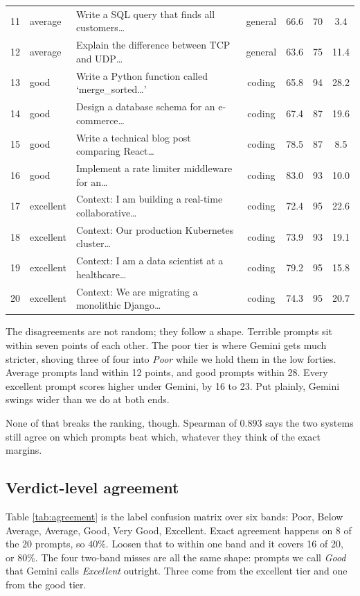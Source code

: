 \documentclass[conference]{IEEEtran}
\begin{document}
\begin{table}[t]
\begin{tabularx}{\textwidth}{rl X cccc}
11 & average   & Write a SQL query that finds all customers\ldots     & general & 66.6 & 70   & 3.4  \\
12 & average   & Explain the difference between TCP and UDP\ldots     & general & 63.6 & 75   & 11.4 \\
13 & good      & Write a Python function called `merge\_sorted\ldots' & coding  & 65.8 & 94   & 28.2 \\
14 & good      & Design a database schema for an e-commerce\ldots     & coding  & 67.4 & 87   & 19.6 \\
15 & good      & Write a technical blog post comparing React\ldots    & coding  & 78.5 & 87   & 8.5  \\
16 & good      & Implement a rate limiter middleware for an\ldots     & coding  & 83.0 & 93   & 10.0 \\
17 & excellent & Context: I am building a real-time collaborative\ldots & coding  & 72.4 & 95   & 22.6 \\
18 & excellent & Context: Our production Kubernetes cluster\ldots     & coding  & 73.9 & 93   & 19.1 \\
19 & excellent & Context: I am a data scientist at a healthcare\ldots & coding  & 79.2 & 95   & 15.8 \\
20 & excellent & Context: We are migrating a monolithic Django\ldots  & coding  & 74.3 & 95   & 20.7 \\
\bottomrule
\end{tabularx}
\end{table}

The disagreements are not random; they follow a shape. Terrible prompts sit within seven points of each other. The poor tier is where Gemini gets much stricter, shoving three of four into \emph{Poor} while we hold them in the low forties. Average prompts land within 12 points, and good prompts within 28. Every excellent prompt scores higher under Gemini, by 16 to 23. Put plainly, Gemini swings wider than we do at both ends.

None of that breaks the ranking, though. Spearman of $0.893$ says the two systems still agree on which prompts beat which, whatever they think of the exact margins.

\subsection{Verdict-level agreement}
Table \ref{tab:agreement} is the label confusion matrix over six bands: Poor, Below Average, Average, Good, Very Good, Excellent. Exact agreement happens on 8 of the 20 prompts, so $40\%$. Loosen that to within one band and it covers 16 of 20, or $80\%$. The four two-band misses are all the same shape: prompts we call \emph{Good} that Gemini calls \emph{Excellent} outright. Three come from the excellent tier and one from the good tier.
\end{document}
